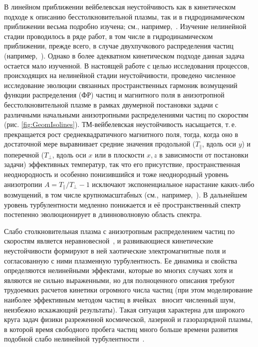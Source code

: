 В линейном приближении вейбелевская неустойчивость как в кинетическом подходе к описанию бесстолкновительной плазмы, так и в гидродинамическом приближении весьма подробно изучена; см., например,~\cite{Kocharovsky2016}. Изучение нелинейной стадии проводилось в ряде работ, в том числе в гидродинамическом приближении, прежде всего, в случае двухпучкового распределения частиц (например,~\cite{Romanov2004,Bychenkov2003}). Однако в более адекватном кинетическом подходе данная задача остается мало изученной. В настоящей работе с целью исследования процессов, происходящих на нелинейной стадии неустойчивости, проведено численное исследование эволюции связанных пространственных гармоник возмущений функции распределения (ФР) частиц и магнитного поля в анизотропной бесстолкновительной плазме в рамках двумерной постановки задачи с различными начальными анизотропными распределениями частиц по скоростям (рис. \ref{fig:GeomIsolines}). ТМ-вейбелевская неустойчивость насыщается, т.\,е. прекращается рост среднеквадратичного магнитного поля, тогда, когда оно в достаточной мере выравнивает средние значения продольной ($T_{\|}$, вдоль оси $y$) и поперечной ($T_\perp $, вдоль оси $x$ или в плоскости $x,z$ в зависимости от постановки задачи) эффективных температур, так что его присутствие, пространственная неоднородность и особенно понизившийся и тоже неоднородный уровень анизотропии $A={T_{\|}}/{T_{\perp}}-1$ исключают экспоненциальное нарастание каких-либо возмущений, в том числе крупномасштабных (см.,~например,~\cite{Borodachev2016_Radiofiz}). В дальнейшем уровень турбулентности медленно понижается и её пространственный спектр постепенно эволюционирует в длинноволновую область спектра.

Слабо столкновительная плазма с анизотропным распределением частиц по скоростям является неравновесной~\cite{Mikhailovsky1971,Krall1973}, и развивающиеся кинетические неустойчивости формируют в ней хаотические электромагнитные поля и согласованную с ними плазменную турбулентность. Ее динамика и свойства определяются нелинейными эффектами, которые во многих случаях хотя и являются не сильно выраженными, но для полноценного описания требуют трудоемких расчетов кинетики огромного числа частиц (при этом моделирование наиболее эффективным методом частиц в ячейках~\cite{Kato2005,Borodachev2010,Ruyer2015,Lazar2022,Borodachev2016_Radiofiz,Romanov2004} вносит численный шум, неизбежно искажающий результаты). Такая ситуация характерна для широкого круга задач физики разреженной космической, лазерной и газоразрядной плазмы, в которой время свободного пробега частиц много больше времени развития подобной слабо нелинейной турбулентности~\cite{Baumjohann2012,Treumann2009,Marcowith2016,Gary1993}. 

